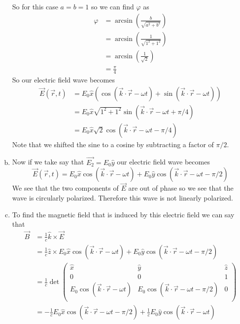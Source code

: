 \documentclass[11pt]{article}
\numberwithin{equation}{section}
\begin{document}
\begin{enumerate}[(a)]
So for this case $a=b=1$ so we can find $\varphi$ as
\begin{align*}
\varphi &= \arcsin\left(\frac{b}{\sqrt{a^2+b^2}}\right)\\
&= \arcsin\left(\frac{1}{\sqrt{1^2+1^2}}\right)\\
&= \arcsin\left(\frac{1}{\sqrt{2}}\right)\\
&= \frac{\pi}{4}
\end{align*}
So our electric field wave becomes 
\begin{align*}
\vec{E}(\vec{r},t) &= E_0\hat{x}\left(\cos(\vec{k}\cdot\vec{r}-\omega t) + \sin(\vec{k}\cdot\vec{r}-\omega t)\right)\\
&= E_0\hat{x}\sqrt{1^2+1^2}\sin(\vec{k}\cdot\vec{r}-\omega t+\pi/4) \\
&= E_0\hat{x}\sqrt{2}\cos(\vec{k}\cdot\vec{r}-\omega t-\pi/4)
\end{align*}
Note that we shifted the sine to a cosine by subtracting a factor of $\pi/2$.

\item
Now if we take say that $\vec{E_2} = E_0\hat{y}$ our electric field wave becomes
$$\vec{E}(\vec{r},t) = E_0\hat{x}\cos(\vec{k}\cdot\vec{r}-\omega t) +E_0\hat{y}\cos(\vec{k}\cdot\vec{r}-\omega t-\pi/2)$$
We see that the two components of $\vec{E}$ are out of phase so we see that the wave is circularly polarized. Therefore this wave is not linearly polarized.

\item
To find the magnetic field that is induced by this electric field we can say that
\begin{align*}
\vec{B} &= \frac{1}{c}\hat{k}\times\vec{E}\\
&= \frac{1}{c}\hat{z}\times E_0\hat{x}\cos(\vec{k}\cdot\vec{r}-\omega t) +E_0\hat{y}\cos(\vec{k}\cdot\vec{r}-\omega t-\pi/2)\\
&= \frac{1}{c}\det\left(\begin{array}{ccc}
	\hat{x}		&\hat{y}		&\hat{z}\\
	0		&0			&1	\\
	E_0\cos(\vec{k}\cdot\vec{r}-\omega t)	&E_0\cos(\vec{k}\cdot\vec{r}-\omega t-\pi/2)	&0\\
	\end{array}\right)\\	
&= -\frac{1}{c}E_0\hat{x}\cos(\vec{k}\cdot\vec{r}-\omega t-\pi/2) + \frac{1}{c}E_0\hat{y}\cos(\vec{k}\cdot\vec{r}-\omega t)
\end{align*}


\end{enumerate}
\end{document}
